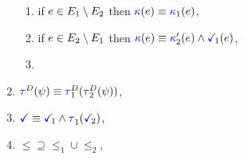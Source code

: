 \begin{figure}
\begin{multicols}{2}
\begin{enumerate}[topsep=0pt,label=(\textsc{s}\arabic*),ref=\textsc{s}\arabic*]
      \begin{enumerate}[leftmargin=0pt]
      \item \label{seq-kappa1}
        if $e\in E_1\setminus E_2$ then ${\color{blue}\kappa}(e) \mathrel{\equiv} {\color{blue}\kappa}_1(e)$,
      \item \label{seq-kappa2}
        if $e\in E_2\setminus E_1$ then $\labelingForm(\aEv) \riff \labelingForm'_2(\aEv) \land \aTerm[1](\aEv)$,
      \item \label{seq-kappa12}
      \end{enumerate}
      \columnbreak
    \item \label{seq-tau}
      $\aTr{\bEvs}{\bForm} \riff \aTr[1]{\bEvs}{\aTr[2]{\bEvs}{\bForm}}$,
    \item \label{seq-term}
      $\aTerm \riff \aTerm[1]\land\aTr[1]{}{\aTerm[2]}$,
    \item \label{seq-le}
      ${\le}\supseteq{\le_1}\cup{\le_2}$,
    \end{enumerate}
  \end{multicols}
  \medskip


\end{figure}
